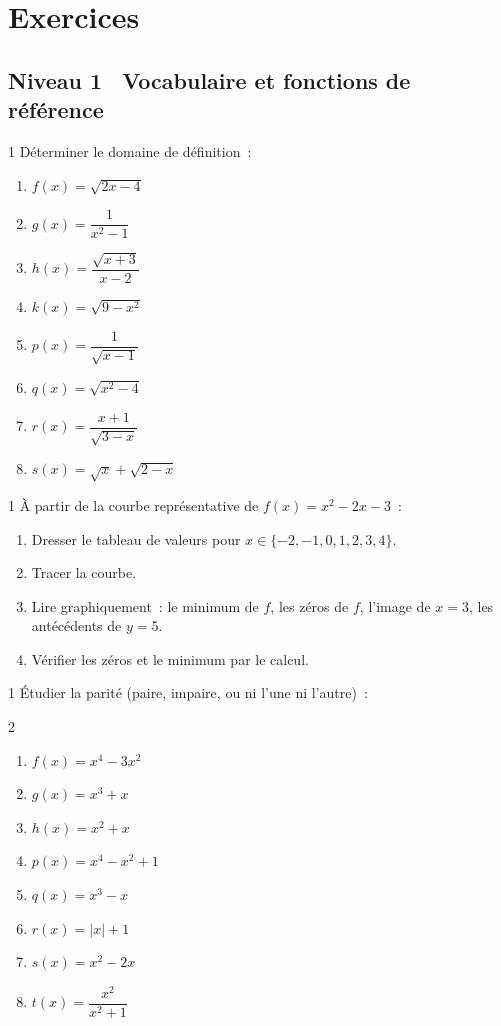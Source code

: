 \section{Exercices}

\subsection*{\quad Niveau 1 \textemdash\ Vocabulaire et fonctions de r\'ef\'erence}

\begin{exo}{1}
D\'eterminer le domaine de d\'efinition~:
\begin{enumerate}
  \item $f(x) = \sqrt{2x-4}$
  \item $g(x) = \dfrac{1}{x^2-1}$
  \item $h(x) = \dfrac{\sqrt{x+3}}{x-2}$
  \item $k(x) = \sqrt{9-x^2}$
  \item $p(x) = \dfrac{1}{\sqrt{x-1}}$
  \item $q(x) = \sqrt{x^2-4}$
  \item $r(x) = \dfrac{x+1}{\sqrt{3-x}}$
  \item $s(x) = \sqrt{x} + \sqrt{2-x}$
\end{enumerate}
\end{exo}

\begin{exo}{1}
\`A partir de la courbe repr\'esentative de $f(x)=x^2-2x-3$~:
\begin{enumerate}
  \item Dresser le tableau de valeurs pour $x \in \{-2,-1,0,1,2,3,4\}$.
  \item Tracer la courbe.
  \item Lire graphiquement~: le minimum de $f$, les z\'eros de $f$,
        l'image de $x=3$, les ant\'ec\'edents de $y=5$.
  \item V\'erifier les z\'eros et le minimum par le calcul.
\end{enumerate}
\end{exo}

\begin{exo}{1}
\'Etudier la parit\'e (paire, impaire, ou ni l'une ni l'autre)~:
\begin{multicols}{2}\small
\begin{enumerate}
  \item $f(x) = x^4 - 3x^2$
  \item $g(x) = x^3 + x$
  \item $h(x) = x^2 + x$
  \item $p(x) = x^4 - x^2 + 1$
  \item $q(x) = x^3 - x$
  \item $r(x) = |x| + 1$
  \item $s(x) = x^2 - 2x$
  \item $t(x) = \dfrac{x^2}{x^2+1}$
\end{enumerate}
\end{multicols}
\end{exo}


